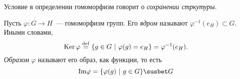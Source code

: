 	Условие в определении гомоморфизм говорит о \emph{сохранении стркутуры}. 

	\begin{definition} 
		Пусть $\varphi\colon G \to H$~--- гомоморфизм групп. Его \emph{ядром} называют $\varphi^{-1}(e_{H}) \subset G$. Иными словами, 
		\[
			\operatorname{Ker}{\varphi} \stackrel{\mathrm{def}}{=} \{ g \in G \ \vert\  \varphi(g) = e_{H} \} = \varphi^{-1}(e_{H}).
		\]
		\emph{Образом} $\varphi$ называют его образ, как функции, то есть 
		\[
			\mathrm{Im}{\varphi} = \{ \varphi(g) \ \vert\  g \in G \} \susbet G
		\]
	\end{definition}

	

	



	

	






	

	




